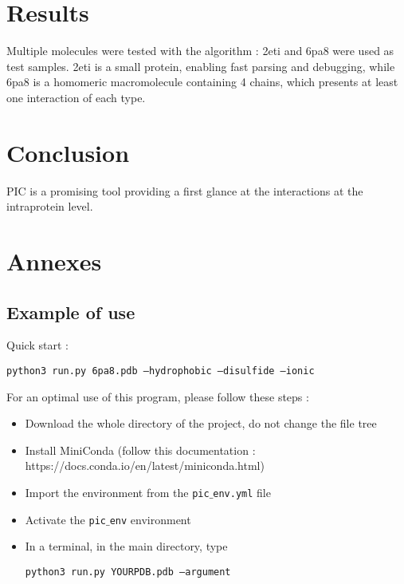 \documentclass[]{article}
\begin{document}
\section{Results}
Multiple molecules were tested with the algorithm : 2eti and 6pa8 were used as test samples. 2eti is a small protein, enabling fast parsing and debugging, while 6pa8 is a homomeric macromolecule containing 4 chains, which presents at least one interaction of each type.

\section{Conclusion}
PIC is a promising tool providing a first glance at the interactions at the intraprotein level.

\newpage
\section{Annexes}
\subsection{Example of use}
Quick start :
\begin{center}\texttt{python3 run.py 6pa8.pdb --hydrophobic --disulfide --ionic}
\end{center}
For an optimal use of this program, please follow these steps :
\begin{itemize}
	\item Download the whole directory of the project, do not change the file tree
	\item Install MiniConda (follow this documentation : https://docs.conda.io/en/latest/miniconda.html)
	\item Import the environment from the \texttt{pic$\_$env.yml} file
	\item Activate the \texttt{pic$\_$env} environment
	\item In a terminal, in the main directory, type
	 \begin{center}\texttt{python3 run.py YOURPDB.pdb --argument}
	 \end{center}
\end{itemize}
\end{document}
